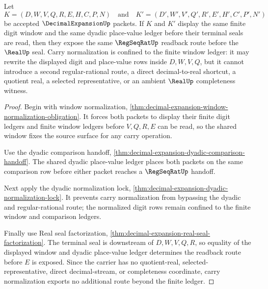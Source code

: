 \begin{theorem}
\label{thm:decimal-expansion-digit-carry-determinacy}
Let
$$
K=(D,W,V,Q,R,E,H,C,P,N)
\quad\text{and}\quad
K'=(D',W',V',Q',R',E',H',C',P',N')
$$
be accepted $\DecimalExpansionUp$ packets. If $K$ and $K'$ display the same finite digit window and the same dyadic place-value ledger before their terminal seals are read, then they expose the same $\RegSeqRatUp$ readback route before the $\RealUp$ seal. Carry normalization is confined to the finite window ledger: it may rewrite the displayed digit and place-value rows inside $D,W,V,Q$, but it cannot introduce a second regular-rational route, a direct decimal-to-real shortcut, a quotient real, a selected representative, or an ambient $\RealUp$ completeness witness.
\end{theorem}
\begin{proof}
Begin with window normalization, \autoref{thm:decimal-expansion-window-normalization-obligation}. It forces both packets to display their finite digit ledgers and finite window ledgers before $V,Q,R,E$ can be read, so the shared window fixes the source surface for any carry operation.

Use the dyadic comparison handoff, \autoref{thm:decimal-expansion-dyadic-comparison-handoff}. The shared dyadic place-value ledger places both packets on the same comparison row before either packet reaches a $\RegSeqRatUp$ handoff.

Next apply the dyadic normalization lock, \autoref{thm:decimal-expansion-dyadic-normalization-lock}. It prevents carry normalization from bypassing the dyadic and regular-rational route; the normalized digit rows remain confined to the finite window and comparison ledgers.

Finally use Real seal factorization, \autoref{thm:decimal-expansion-real-seal-factorization}. The terminal seal is downstream of $D,W,V,Q,R$, so equality of the displayed window and dyadic place-value ledger determines the readback route before $E$ is exposed. Since the carrier has no quotient-real, selected-representative, direct decimal-stream, or completeness coordinate, carry normalization exports no additional route beyond the finite ledger.
\end{proof}

